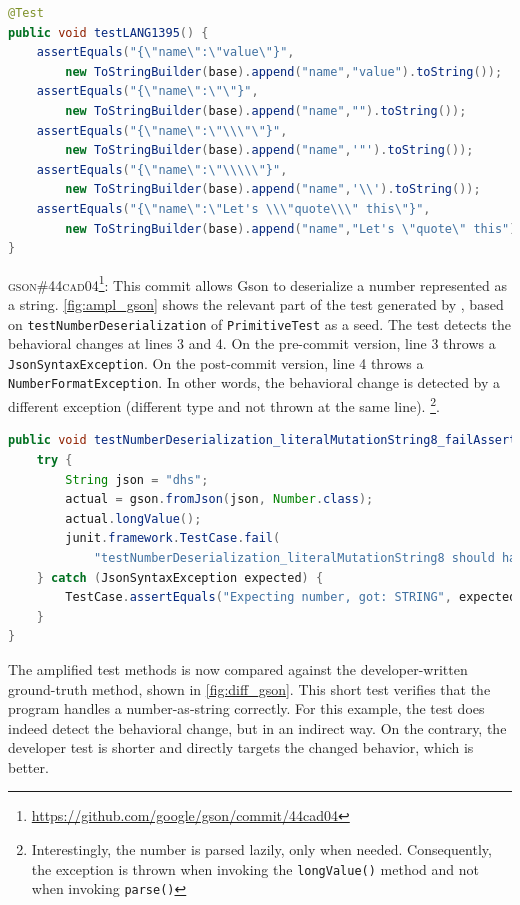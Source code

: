 \begin{lstlisting}[float,language=java,caption=Developer test for \textsc{e7d16c2} of commons-lang.,label=fig:diff_commons-lang]
@Test
public void testLANG1395() {
	assertEquals("{\"name\":\"value\"}",
		new ToStringBuilder(base).append("name","value").toString());
	assertEquals("{\"name\":\"\"}",
		new ToStringBuilder(base).append("name","").toString());
	assertEquals("{\"name\":\"\\\"\"}",
		new ToStringBuilder(base).append("name",'"').toString());
	assertEquals("{\"name\":\"\\\\\"}",
		new ToStringBuilder(base).append("name",'\\').toString());
	assertEquals("{\"name\":\"Let's \\\"quote\\\" this\"}",
		new ToStringBuilder(base).append("name","Let's \"quote\" this").toString());
}
\end{lstlisting}

\textsc{gson\#44cad04}\footnote{\url{https://github.com/google/gson/commit/44cad04}}: This commit allows Gson to deserialize a number represented as a string.
\autoref{fig:ampl_gson} shows the relevant part of the test generated by \DCII, based on \texttt{testNumberDeserialization} of \texttt{PrimitiveTest} as a seed.
The \DCI test detects the behavioral changes at lines 3 and 4.
On the pre-commit version, line 3 throws a \texttt{JsonSyntaxException}.
On the post-commit version, line 4 throws a \texttt{NumberFormatException}.
In other words, the behavioral change is detected by a different exception (different type and not thrown at the same line).
\footnote{Interestingly, the number is parsed lazily, only when needed. 
Consequently, the exception is thrown when invoking the \texttt{longValue()} method and not when invoking \texttt{parse()}}.

\begin{lstlisting}[float,language=java,caption=Test generated by DCI that detects the behavioral change of commit \textsc{44cad04} in Gson.,label=fig:ampl_gson]
public void testNumberDeserialization_literalMutationString8_failAssert0() throws Exception {
	try {
		String json = "dhs";
		actual = gson.fromJson(json, Number.class);
		actual.longValue();
		junit.framework.TestCase.fail(
			"testNumberDeserialization_literalMutationString8 should have thrown JsonSyntaxException");
	} catch (JsonSyntaxException expected) {
		TestCase.assertEquals("Expecting number, got: STRING", expected.getMessage());
	}
}
\end{lstlisting}
The amplified test methods is now compared against the developer-written ground-truth method, shown in \autoref{fig:diff_gson}. 
This short test verifies that the program handles a number-as-string correctly.
For this example, the \DCI test does indeed detect the behavioral change, but in an indirect way.
On the contrary, the developer test is shorter and directly targets the changed behavior, which is better.

